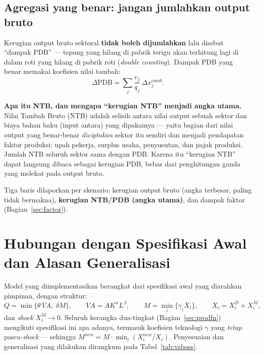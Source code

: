 \documentclass[11pt,a4paper]{article}
\newcommand{\en}[1]{\textit{#1}}   %
\begin{document}
\subsection{Agregasi yang benar: jangan jumlahkan output bruto}

Kerugian output bruto sektoral \textbf{tidak boleh dijumlahkan} lalu
disebut ``dampak PDB'' --- tepung yang hilang di pabrik terigu akan
terhitung lagi di dalam roti yang hilang di pabrik roti
(\en{double counting}). Dampak PDB yang benar memakai koefisien nilai
tambah:
\begin{equation}
\Delta \text{PDB} = \sum_j \frac{v_j}{q_j}\,\Delta x^{comb}_j .
\end{equation}
\begin{intuisi}
\textbf{Apa itu NTB, dan mengapa ``kerugian NTB'' menjadi angka utama.}
Nilai Tambah Bruto (NTB) adalah selisih antara nilai output sebuah sektor
dan biaya bahan baku (input antara) yang dipakainya --- yaitu bagian dari
nilai output yang benar-benar \emph{diciptakan} sektor itu sendiri dan
menjadi pendapatan faktor produksi: upah pekerja, surplus usaha,
penyusutan, dan pajak produksi. Jumlah NTB seluruh sektor sama dengan PDB.
Karena itu ``kerugian NTB'' dapat langsung dibaca sebagai kerugian PDB,
bebas dari penghitungan ganda yang melekat pada output bruto.
\end{intuisi}

Tiga baris dilaporkan per skenario: kerugian output bruto (angka terbesar,
paling tidak bermakna), \textbf{kerugian NTB/PDB (angka utama)}, dan
dampak faktor (Bagian~\ref{sec:factor}).

\section{Hubungan dengan Spesifikasi Awal dan Alasan Generalisasi}
\label{sec:boss}

Model yang diimplementasikan berangkat dari spesifikasi awal yang diarahkan
pimpinan, dengan struktur:
\begin{equation}
Q = \min\{\theta\,VA,\; \delta M\}, \qquad
VA = AK^{\alpha}L^{\beta}, \qquad
M = \min_i\{\gamma_i X_i\}, \qquad
X_i = X_i^D + X_i^M,
\label{eq:bossspec}
\end{equation}
dan \en{shock} $X_i^M \to 0$. Seluruh kerangka dua-tingkat
(Bagian~\ref{sec:prodfn}) mengikuti spesifikasi ini apa adanya, termasuk
koefisien teknologi $\gamma$ yang \emph{tetap} pasca-\en{shock} --- sehingga
$M^{new} = M \cdot \min_i (X_i^{new}/X_i)$. Penyesuaian dan generalisasi
yang dilakukan dirangkum pada Tabel~\ref{tab:vsboss}.
\end{document}
